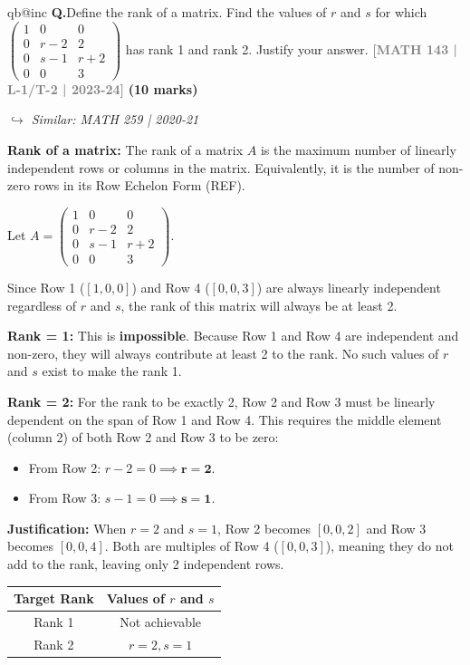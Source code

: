 \documentclass[12pt,a3paper]{article}
\makeatletter
\newcommand{\yr}[1]{\hfill\textcolor{gray}{\small\textbf{[#1]}}}
\newcommand{\mk}[1]{\textcolor{orange!70!black}{\small\textbf{(#1 marks)}}}
\newcommand{\variant}[1]{\par\vspace{1pt}\textcolor{blue!50!black}%
  {\footnotesize\textit{$\hookrightarrow$ Similar: #1}}}
\newcounter{qnum}
\newcommand{\Q}[1]{%
  \csname qb@inc\endcsname
  \needspace{4\baselineskip}
  \refstepcounter{qnum}
  \vspace{6pt}
  \noindent\textbf{Q\theqnum.}\enspace #1\par
}
\makeatother
\begin{document}
\Q{Define the rank of a matrix. Find the values of $r$ and $s$ for which
$\begin{pmatrix} 1 & 0 & 0 \\ 0 & r-2 & 2 \\ 0 & s-1 & r+2 \\ 0 & 0 & 3 \end{pmatrix}$
has rank 1 and rank 2. Justify your answer.
\yr{MATH 143 | L-1/T-2 | 2023-24} \mk{10}
\variant{MATH 259 | 2020-21}}

\begin{tcolorbox}[enhanced,breakable,
  colback=cB!4,colframe=cB,boxrule=0.8pt,arc=5pt,
  title={\textbf{Answer --- Rank Definition; Values of $r,s$ for Given Ranks}},
  fonttitle=\bfseries\color{white},colbacktitle=cB]

\textbf{Rank of a matrix:} The rank of a matrix $A$ is the maximum number of linearly independent rows or columns in the matrix. Equivalently, it is the number of non-zero rows in its Row Echelon Form (REF).

\medskip
Let $A = \begin{pmatrix} 1 & 0 & 0 \\ 0 & r-2 & 2 \\ 0 & s-1 & r+2 \\ 0 & 0 & 3 \end{pmatrix}$.

Since Row 1 ($[1, 0, 0]$) and Row 4 ($[0, 0, 3]$) are always linearly independent regardless of $r$ and $s$, the rank of this matrix will always be at least 2.

\textbf{Rank = 1:} This is \textbf{impossible}. Because Row 1 and Row 4 are independent and non-zero, they will always contribute at least 2 to the rank. No such values of $r$ and $s$ exist to make the rank 1.

\textbf{Rank = 2:} For the rank to be exactly 2, Row 2 and Row 3 must be linearly dependent on the span of Row 1 and Row 4. This requires the middle element (column 2) of both Row 2 and Row 3 to be zero:
\begin{itemize}
    \item From Row 2: $r - 2 = 0 \implies \mathbf{r = 2}$.
    \item From Row 3: $s - 1 = 0 \implies \mathbf{s = 1}$.
\end{itemize}

\textbf{Justification:} When $r=2$ and $s=1$, Row 2 becomes $[0, 0, 2]$ and Row 3 becomes $[0, 0, 4]$. Both are multiples of Row 4 ($[0, 0, 3]$), meaning they do not add to the rank, leaving only 2 independent rows.

\begin{center}
\small
\begin{tabular}{@{}cc@{}}
\toprule
\textbf{Target Rank} & \textbf{Values of $r$ and $s$} \\
\midrule
Rank 1 & Not achievable \\
Rank 2 & $r = 2, s = 1$ \\
\bottomrule
\end{tabular}
\end{center}

\end{tcolorbox}
\end{document}
